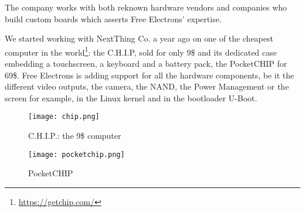 The company works with both reknown hardware vendors and companies who build custom boards which asserts Free Electrons' expertise.

We started working with NextThing Co. a year ago on one of the cheapest computer in the world\footnote{\url{https://getchip.com/}}: the C.H.I.P, sold for only 9\$ and its dedicated case embedding a touchscreen, a keyboard and a battery pack, the PocketCHIP for 69\$. Free Electrons is adding support for all the hardware components, be it the different video outputs, the camera, the NAND, the Power Management or the screen for example, in the Linux kernel and in the bootloader U-Boot.

\begin{figure}[H]
  \centering
  \begin{minipage}[b]{0.45\textwidth}
    \texttt{[image: chip.png]}
    \caption{C.H.I.P.: the 9\$ computer}
  \end{minipage}
  \hfill
  \begin{minipage}[b]{0.45\textwidth}
    \centerline{\texttt{[image: pocketchip.png]}}
    \caption{PocketCHIP}
  \end{minipage}
\end{figure}
